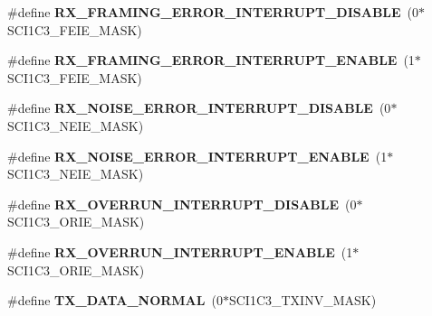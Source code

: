 \begin{DoxyCompactItemize}
\item 
\hypertarget{group__hal__hcs08_gaea33d14c8ee7cd8d79faec9f0c981a61}{\#define {\bfseries R\-X\-\_\-\-F\-R\-A\-M\-I\-N\-G\-\_\-\-E\-R\-R\-O\-R\-\_\-\-I\-N\-T\-E\-R\-R\-U\-P\-T\-\_\-\-D\-I\-S\-A\-B\-L\-E}~(0$\ast$S\-C\-I1\-C3\-\_\-\-F\-E\-I\-E\-\_\-\-M\-A\-S\-K)}\label{group__hal__hcs08_gaea33d14c8ee7cd8d79faec9f0c981a61}

\item 
\hypertarget{group__hal__hcs08_ga821b12b9b4fcdb4687fef78a7fb876bb}{\#define {\bfseries R\-X\-\_\-\-F\-R\-A\-M\-I\-N\-G\-\_\-\-E\-R\-R\-O\-R\-\_\-\-I\-N\-T\-E\-R\-R\-U\-P\-T\-\_\-\-E\-N\-A\-B\-L\-E}~(1$\ast$S\-C\-I1\-C3\-\_\-\-F\-E\-I\-E\-\_\-\-M\-A\-S\-K)}\label{group__hal__hcs08_ga821b12b9b4fcdb4687fef78a7fb876bb}

\item 
\hypertarget{group__hal__hcs08_ga0541125834b75b553db07263155e2b90}{\#define {\bfseries R\-X\-\_\-\-N\-O\-I\-S\-E\-\_\-\-E\-R\-R\-O\-R\-\_\-\-I\-N\-T\-E\-R\-R\-U\-P\-T\-\_\-\-D\-I\-S\-A\-B\-L\-E}~(0$\ast$S\-C\-I1\-C3\-\_\-\-N\-E\-I\-E\-\_\-\-M\-A\-S\-K)}\label{group__hal__hcs08_ga0541125834b75b553db07263155e2b90}

\item 
\hypertarget{group__hal__hcs08_ga47a73e96478b0cc59f0f7f148347e8a4}{\#define {\bfseries R\-X\-\_\-\-N\-O\-I\-S\-E\-\_\-\-E\-R\-R\-O\-R\-\_\-\-I\-N\-T\-E\-R\-R\-U\-P\-T\-\_\-\-E\-N\-A\-B\-L\-E}~(1$\ast$S\-C\-I1\-C3\-\_\-\-N\-E\-I\-E\-\_\-\-M\-A\-S\-K)}\label{group__hal__hcs08_ga47a73e96478b0cc59f0f7f148347e8a4}

\item 
\hypertarget{group__hal__hcs08_ga48b69442c30bac047ea2225225649588}{\#define {\bfseries R\-X\-\_\-\-O\-V\-E\-R\-R\-U\-N\-\_\-\-I\-N\-T\-E\-R\-R\-U\-P\-T\-\_\-\-D\-I\-S\-A\-B\-L\-E}~(0$\ast$S\-C\-I1\-C3\-\_\-\-O\-R\-I\-E\-\_\-\-M\-A\-S\-K)}\label{group__hal__hcs08_ga48b69442c30bac047ea2225225649588}

\item 
\hypertarget{group__hal__hcs08_gaa1b1d5ac782ce2e3e33a797386b4dab5}{\#define {\bfseries R\-X\-\_\-\-O\-V\-E\-R\-R\-U\-N\-\_\-\-I\-N\-T\-E\-R\-R\-U\-P\-T\-\_\-\-E\-N\-A\-B\-L\-E}~(1$\ast$S\-C\-I1\-C3\-\_\-\-O\-R\-I\-E\-\_\-\-M\-A\-S\-K)}\label{group__hal__hcs08_gaa1b1d5ac782ce2e3e33a797386b4dab5}

\item 
\hypertarget{group__hal__hcs08_ga5e47942b893d3f497abbbb9bfb482b68}{\#define {\bfseries T\-X\-\_\-\-D\-A\-T\-A\-\_\-\-N\-O\-R\-M\-A\-L}~(0$\ast$S\-C\-I1\-C3\-\_\-\-T\-X\-I\-N\-V\-\_\-\-M\-A\-S\-K)}\label{group__hal__hcs08_ga5e47942b893d3f497abbbb9bfb482b68}


\end{DoxyCompactItemize}
